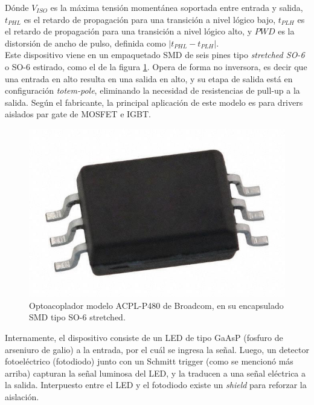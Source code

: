 Dónde $V_{ISO}$ es la máxima tensión momentánea soportada entre entrada y salida, $t_{PHL}$ es el retardo de propagación para una transición a nivel lógico bajo, $t_{PLH}$ es el retardo de propagación para una transición a nivel lógico alto, y $PWD$ es la distorsión de ancho de pulso, definida como $|t_{PHL} - t_{PLH}|$.\\

Este dispositivo viene en un empaquetado SMD de seis pines tipo \textit{stretched SO-6} o SO-6 estirado, como el de la figura \ref{encapsulado_opto}. Opera de forma no inversora, es decir que una entrada en alto resulta en una salida en alto, y su etapa de salida está en configuración \textit{totem-pole}, eliminando la necesidad de resistencias de pull-up a la salida. Según el fabricante, la principal aplicación de este modelo es para drivers aislados par gate de MOSFET e IGBT.\\

\begin{figure}[h]
    \centering
    \includegraphics[scale=0.2]{Imagenes/SO6 Stretched.jpeg}
    \caption{Optoacoplador modelo ACPL-P480 de Broadcom, en su encapsulado SMD tipo SO-6 stretched.}
    \label{encapsulado_opto}
\end{figure}

Internamente, el dispositivo consiste de un LED de tipo GaAsP (fosfuro de arseniuro de galio) a la entrada, por el cuál se ingresa la señal. Luego, un detector fotoeléctrico (fotodiodo) junto con un Schmitt trigger (como se mencionó más arriba) capturan la señal luminosa del LED, y la traducen a una señal eléctrica a la salida. Interpuesto entre el LED y el fotodiodo existe un \textit{shield} para reforzar la aislación.\\

